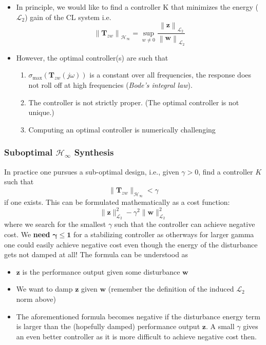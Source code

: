 \newpar{}
\begin{itemize}
    \item In principle, we would like to find a controller K that minimizes the energy ($\mathcal{L}_2$) gain of the CL system i.e.
          \begin{equation*}
              \left\|\mathbf{T}_{zw}\right\|_{\mathcal{H}_\infty}=\sup_{w\neq0}\frac{\left\|\mathbf{z}\right\|_{\mathcal{L}_2}}{\left\|\mathbf{w}\right\|_{\mathcal{L}_2}}
          \end{equation*}
    \item However, the optimal controller(s) are such that
          \begin{enumerate}
              \item $\sigma_{\max}(\mathbf{T}_{zw}(j\omega))$ is a constant over all frequencies, the response does not roll off at high frequencies (\textit{Bode's integral law}).
              \item The controller is not strictly proper. (The optimal controller is not unique.)
              \item Computing an optimal controller is numerically challenging
          \end{enumerate}
\end{itemize}

\subsubsection[Suboptimal H-infinity Synthesis]{Suboptimal $\mathcal{H}_\infty$ Synthesis}
In practice one pursues a sub-optimal design, i.e., given $\gamma>0$, find a controller $K$ such that
\begin{equation*}
    \|\mathbf{T}_{zw}\|_{\mathcal{H}_\infty}<\gamma
\end{equation*}
if one exists. This can be formulated mathematically as a cost function:
\begin{equation*}
    \|\mathbf{z}\|_{\mathcal{L}_2}^2-\gamma^2\|\mathbf{w}\|_{\mathcal{L}_2}^2
\end{equation*}
where we search for the smallest $\gamma$ such that the controller can achieve negative cost. We \textbf{need} $\boldsymbol{\gamma}\mathbf{\le1}$ for a stabilizing controller as otherways for larger gamma one could easily achieve negative cost even though the energy of the disturbance gets not damped at all! The formula can be understood as
\begin{itemize}
    \item $\mathbf{z}$ is the performance output given some disturbance $\mathbf{w}$
    \item We want to damp $\mathbf{z}$ given $\mathbf{w}$ (remember the definition of the induced $\mathcal{L}_2$ norm above)
    \item The aforementioned formula becomes negative if the disturbance energy term is larger than the (hopefully damped) performance output $\mathbf{z}$. A small $\gamma$ gives an even better controller as it is more difficult to achieve negative cost then.
\end{itemize}

